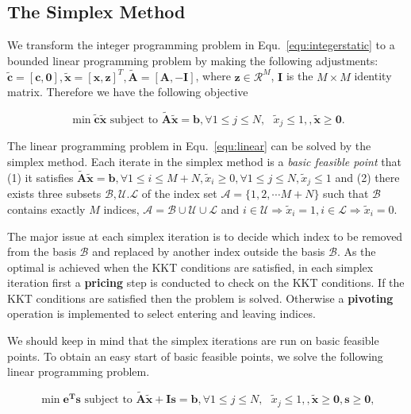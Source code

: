 \documentclass{llncs}
\begin{document}
\subsection{The Simplex Method}
We transform the integer programming problem in Equ.~\ref{equ:integerstatic} to a bounded linear programming problem by making the following adjustments: $\tilde{\mathbf{c}}=[\mathbf{c},\mathbf{0}],\tilde{\mathbf{x}}=[\mathbf{x},\mathbf{z}]^T,\tilde{\mathbf{A}}=[\mathbf{A},-\mathbf{I}]$, where $\mathbf{z}\in\mathcal{R}^M$, $ \mathbf{I}$ is the $M\times M$ identity matrix. Therefore we have the following objective

\begin{equation}\label{equ:linear}
\min \tilde{\mathbf{c}}\tilde{\mathbf{x}}\textrm{ subject to } \tilde{\mathbf{A}}\tilde{\mathbf{x}} = \mathbf{b}, \forall 1\leq j\leq N,\textrm{ } \tilde{x}_j \leq 1, ,\tilde{\mathbf{x}}\geq \mathbf{0}.
\end{equation}

The linear programming problem in Equ.~\ref{equ:linear} can be solved by the simplex method. Each iterate in the simplex method is a \emph{basic feasible point} that (1) it satisfies $\tilde{\mathbf{A}}\tilde{\mathbf{x}} = \mathbf{b}, \forall 1\leq i\leq M+N,\tilde{x}_i \geq 0,\forall 1\leq j\leq N, \tilde{x}_j \leq 1$ and (2) there exists three subsets $\mathcal{B,U.L}$ of the index set $\mathcal{A}=\{1,2,\cdots M+N\}$ such that $\mathcal{B}$ contains exactly $M$ indices, $\mathcal{A}=\mathcal{B}\cup \mathcal{U} \cup \mathcal{L}$ and $i \in \mathcal{U} \Rightarrow \tilde{x}_i=1,i \in \mathcal{L} \Rightarrow \tilde{x}_i=0$.

The major issue at each simplex iteration is to decide which index to be removed from the basis $\mathcal{B}$ and replaced by another index outside the basis $\mathcal{B}$.  As the optimal is achieved when the KKT conditions are satisfied, in each simplex iteration first  a \textbf{pricing} step is conducted to check on the KKT conditions.  If the KKT conditions are satisfied then the problem is solved. Otherwise a \textbf{pivoting} operation is implemented to select entering and leaving indices.

We should keep in mind that the simplex iterations are run on basic feasible points. To obtain an easy start of basic feasible points, we solve the following linear programming problem.

\begin{equation}\label{equ:linearphaseI}
\min \mathbf{e^{T}s} \textrm{ subject to } \tilde{\mathbf{A}}\tilde{\mathbf{x}} + \mathbf{Is} = \mathbf{b},  \forall 1\leq j\leq N,\textrm{ } \tilde{x}_j \leq 1, ,\tilde{\mathbf{x}}\geq \mathbf{0}, \mathbf{s}\geq \mathbf{0},
\end{equation}
\end{document}
